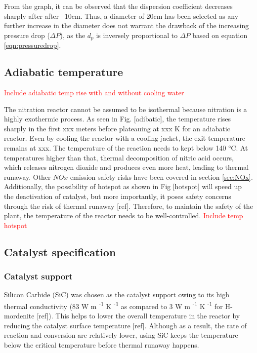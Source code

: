From the graph, it can be observed that the dispersion coefficient decreases sharply after after ~10cm. Thus, a diameter of 20cm has been selected as any further increase in the diameter does not warrant the drawback of the increasing pressure drop ($\Delta P$), as the $d_p$ is inversely proportional to $\Delta P$ based on equation \ref{eqn:pressuredrop}.
\subsection{Adiabatic temperature}

\textcolor{red}{Include adiabatic temp rise with and without cooling water}

The nitration reactor cannot be assumed to be isothermal because nitration is a highly exothermic process. As seen in Fig. [adibatic], the temperature rises sharply in the first xxx meters before plateauing at xxx K for an adiabatic reactor. Even by cooling the reactor with a cooling jacket, the exit temperature remains at xxx. The temperature of the reaction needs to kept below 140 °C. At temperatures higher than that, thermal decomposition of nitric acid occurs, which releases nitrogen dioxide and produces even more heat, leading to thermal runaway. Other $NOx$ emission safety risks have been covered in section \ref{sec:NOx}. Additionally, the possibility of hotspot as shown in Fig [hotspot] will speed up the deactivation of catalyst, but more importantly, it poses safety concerns through the risk of thermal runaway [ref]. Therefore, to maintain the safety of the plant, the temperature of the reactor needs to be well-controlled.
\textcolor{red}{Include temp hotspot}

\subsection{Catalyst specification}
\subsubsection{Catalyst support}
Silicon Carbide (SiC) was chosen as the catalyst support owing to its high thermal conductivity (83 W m \textsuperscript{-1} K \textsuperscript{-1} as compared to 3 W m \textsuperscript{-1} K \textsuperscript{-1} for H-mordenite [ref]). This helps to lower the overall temperature in the reactor by reducing the catalyst surface temperature [ref]. Although as a result, the rate of reaction and conversion are relatively lower, using SiC keeps the temperature below the critical temperature before thermal runaway happens. 


